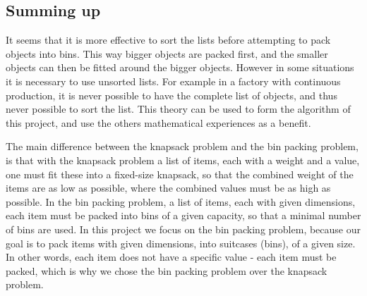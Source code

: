 \subsection{Summing up}
It seems that it is more effective to sort the lists before attempting to pack objects into bins. This way bigger objects are packed first, and the smaller objects can then be fitted around the bigger objects. However in some situations it is necessary to use unsorted lists. For example in a factory with continuous production, it is never possible to have the complete list of objects, and thus never possible to sort the list. This theory can be used to form the algorithm of this project, and use the others mathematical experiences as a benefit.


The main difference between the knapsack problem  and the bin packing problem, is that with the knapsack problem a list of items, each with a weight and a value, one must fit these into a fixed-size knapsack, so that the combined weight of the items are as low as possible, where the combined values must be as high as possible. In the bin packing problem, a list of items, each with given dimensions, each item must be packed into bins of a given capacity, so that a minimal number of bins are used. In this project we focus on the bin packing problem, because our goal is to pack items with given dimensions, into suitcases (bins), of a given size. In other words, each item does not have a specific value - each item must be packed, which is why we chose the bin packing problem over the knapsack problem. 

